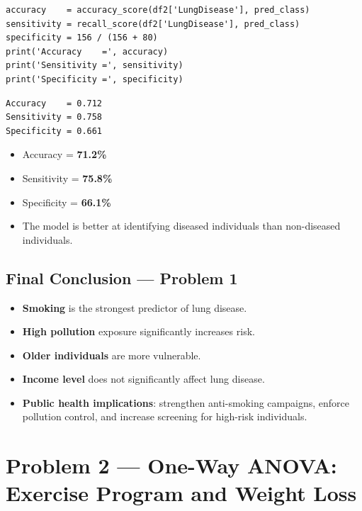 \documentclass[12pt,a4paper]{article}
\begin{document}
\begin{lstlisting}
accuracy    = accuracy_score(df2['LungDisease'], pred_class)
sensitivity = recall_score(df2['LungDisease'], pred_class)
specificity = 156 / (156 + 80)
print('Accuracy    =', accuracy)
print('Sensitivity =', sensitivity)
print('Specificity =', specificity)
\end{lstlisting}

\begin{outputbox}
\begin{verbatim}
Accuracy    = 0.712
Sensitivity = 0.758
Specificity = 0.661
\end{verbatim}
\end{outputbox}

\begin{interpbox}
\begin{itemize}[noitemsep]
  \item Accuracy = \textbf{71.2\%}
  \item Sensitivity = \textbf{75.8\%}
  \item Specificity = \textbf{66.1\%}
  \item The model is better at identifying diseased individuals than non-diseased individuals.
\end{itemize}
\end{interpbox}

\subsection{Final Conclusion — Problem 1}
\begin{interpbox}
\begin{itemize}[noitemsep]
  \item \textbf{Smoking} is the strongest predictor of lung disease.
  \item \textbf{High pollution} exposure significantly increases risk.
  \item \textbf{Older individuals} are more vulnerable.
  \item \textbf{Income level} does not significantly affect lung disease.
  \item \textbf{Public health implications}: strengthen anti-smoking campaigns, enforce pollution control, and increase screening for high-risk individuals.
\end{itemize}
\end{interpbox}

\newpage
\section{Problem 2 — One-Way ANOVA: Exercise Program and Weight Loss}
\end{document}
